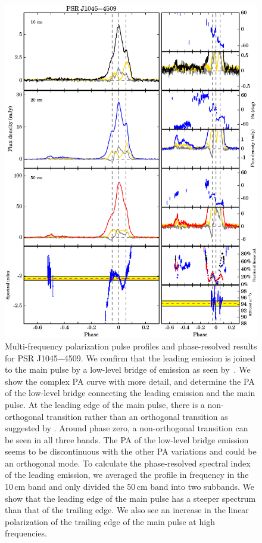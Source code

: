 \documentclass[useAMS,usenatbib]{mn2e}
\begin{document}
\begin{appendix}
\begin{figure}
\begin{center}
\includegraphics[width=6 in]{1045.ps}
\caption{Multi-frequency polarization pulse profiles and phase-resolved results for PSR J1045$-$4509. 
We confirm that the leading emission is joined to the main pulse by a low-level bridge of emission as 
seen by~\citet{Yan11}.
%
We show the complex PA curve with more detail, and determine the PA of the 
low-level bridge connecting the leading emission and the main pulse.
%
At the leading edge of the main pulse, there is a non-orthogonal transition 
rather than an orthogonal transition as suggested by \citet{Yan11}.
%
Around phase zero, a non-orthogonal transition can be seen in all 
three bands.
%
The PA of the low-level bridge emission seems to be discontinuous with 
the other PA variations and could be an orthogonal mode.
%
To calculate the phase-resolved spectral index of the leading emission, 
we averaged the profile in frequency in the 10\,cm band and only 
divided the 50\,cm band into two subbands.
%
We show that the leading edge of the main pulse has a steeper spectrum 
than that of the trailing edge.
%
We also see an increase in the linear polarization of the trailing 
edge of the main pulse at high frequencies.
}
\label{1045}
\end{center}
\end{figure}


\end{appendix}
\end{document}
